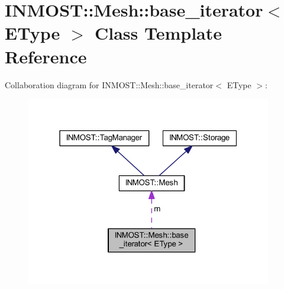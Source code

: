 \hypertarget{classINMOST_1_1Mesh_1_1base__iterator}{\section{I\-N\-M\-O\-S\-T\-:\-:Mesh\-:\-:base\-\_\-iterator$<$ E\-Type $>$ Class Template Reference}
\label{classINMOST_1_1Mesh_1_1base__iterator}
}


Collaboration diagram for I\-N\-M\-O\-S\-T\-:\-:Mesh\-:\-:base\-\_\-iterator$<$ E\-Type $>$\-:
\nopagebreak
\begin{figure}[H]
\begin{center}
\leavevmode
\includegraphics[width=304pt]{classINMOST_1_1Mesh_1_1base__iterator__coll__graph}
\end{center}
\end{figure}
